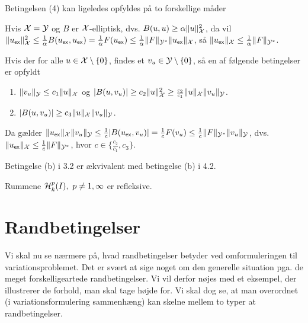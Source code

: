 Betingelsen (4) kan ligeledes opfyldes på to forskellige måder
\begin{userenumerate}{4}
  \item Hvis $\mathcal{X} = \mathcal{Y}$ og $B$ er $\mathcal{X}$-elliptisk, dvs.  
        $B(u,u) \geq \alpha \|u\|^2_{\mathcal{X}}$, da vil 
        $\|u_{\mathsf{ex}}\|^2_{\mathcal{X}} \leq \frac{1}{\alpha} B(u_{\mathsf{ex}},u_{\mathsf{ex}}) = 
        \frac{1}{\alpha} F(u_{\mathsf{ex}}) \leq \frac{1}{\alpha} \|F\|_{\mathcal{Y}^{\ast}} 
        \|u_{\mathsf{ex}}\|_{\mathcal{X}}$, så
        $\|u_{\mathsf{ex}}\|_{\mathcal{X}} \leq \frac{1}{\alpha} \|F\|_{\mathcal{Y}^{\ast}}$.
  \item Hvis der for alle $u \in \mathcal{X} \setminus \{0\}$, findes et 
        $v_u \in \mathcal{Y} \setminus \{0\}$, så en af følgende betingelser er
        opfyldt 
          \begin{enumerate}
            \item $\|v_u\|_{\mathcal{Y}} \leq c_1 \|u\|_{\mathcal{X}}$ og
                  $|B(u,v_u)| \geq c_2 \|u\|^2_{\mathcal{X}} \geq 
                  {\scriptstyle{\frac{c_2}{c_1}}} 
                  \|u\|_{\mathcal{X}} \|v_u\|_{\mathcal{Y}}$.
            \item $|B(u,v_u)| \geq c_3 \|u\|_{\mathcal{X}} \|v_u\|_{\mathcal{Y}}$.
          \end{enumerate}
        Da gælder 
        $\|u_{\mathsf{ex}}\|_{\mathcal{X}} \|v_u\|_{\mathcal{Y}} \leq \frac{1}{c} |B(u_{\mathsf{ex}},v_u)| =
        \frac{1}{c} F(v_u) \leq \frac{1}{c} \|F\|_{\mathcal{Y}^{\ast}}
        \|v_u\|_{\mathcal{Y}}$, dvs. \newline $\|u_{\mathsf{ex}}\|_{\mathcal{X}} \leq \frac{1}{c}
        \|F\|_{\mathcal{Y}^{\ast}}$, hvor $c\in\{{\scriptstyle{\frac{c_2}{c_1}}},c_3\}$.      
\end{userenumerate}
\begin{remark}
Betingelse (b) i 3.2 er ækvivalent med betingelse (b) i 4.2.
\end{remark}
\begin{remark}
Rummene $\mathcal H^{p}_{k}(I), \ p\not = 1,\infty$ er refleksive.
\end{remark}

\section{Randbetingelser}
Vi skal nu se nærmere på, hvad randbetingelser betyder ved
omformuleringen til variationsproblemet. Det er svært at sige noget
om den generelle situation pga. de meget forskelligeartede
randbetingelser. Vi vil derfor nøjes med et eksempel, der illustrerer
de forhold, man skal tage højde for. Vi skal dog se, at man overordnet
(i variationsformulering sammenhæng) kan skelne mellem to typer at
randbetingelser.

